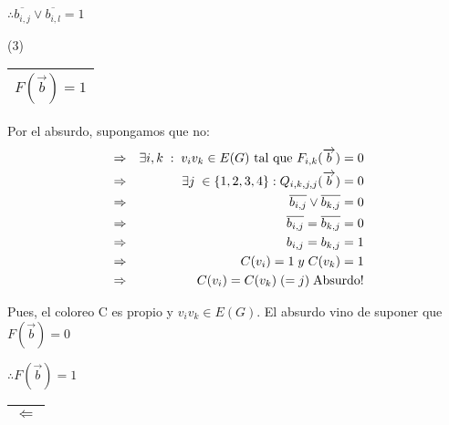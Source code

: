 \documentclass[12pt,a4paper]{report}
\begin{document}
					\vspace{3mm}
					$\therefore \overline{b_{i, j}} \vee \overline{b_{i, l}} = 1$

				\vspace{3mm}
				(3) \begin{tabular}{|c|} \hline $F(\overrightarrow{b}) = 1$ \\ \hline \end{tabular}
				\vspace{3mm}

					\par Por el absurdo, supongamos que no:
					\begin{eqnarray}
						\nonumber &\Rightarrow & \exists i, k \; : \; v_{i} v_{k} \in E(G) \textup{ tal que } F_{i, k}(\overrightarrow{b}) = 0 \\
						\nonumber &\Rightarrow & \exists j \; \in \lbrace 1, 2, 3, 4 \rbrace : Q_{i, k, j, j}(\overrightarrow{b}) = 0 \\
						\nonumber &\Rightarrow & \overline{b_{i, j}} \vee \overline{b_{k, j}} = 0 \\
						\nonumber &\Rightarrow & \overline{b_{i, j}} = \overline{b_{k, j}} = 0 \\
						\nonumber &\Rightarrow & b_{i, j} = b_{k, j} = 1 \\
						\nonumber &\Rightarrow & C(v_{i}) = 1\; y \; C(v_{k}) = 1\\
						\nonumber &\Rightarrow & C(v_{i}) = C(v_{k}) \; (= j) \; \textup{Absurdo!}
					\end{eqnarray}
					\par Pues, el coloreo C es propio y $v_{i} v_{k} \in E(G)$. El absurdo vino de suponer que $F(\overrightarrow{b}) = 0$

					\vspace{3mm}
					\par $\therefore F(\overrightarrow{b}) = 1$

			\vspace{5mm}
			\begin{tabular}{|c|} \hline $\Leftarrow$ \\ \hline \end{tabular}
\end{document}
